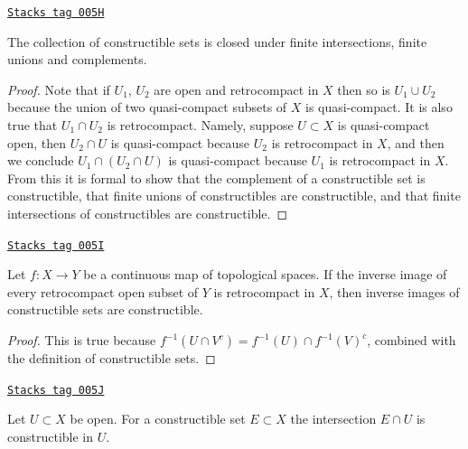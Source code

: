 \begin{lemma}[Constructible]
\label{topology-lemma-constructible}
\href{https://stacks.math.columbia.edu/tag/005H}{\texttt{Stacks tag 005H}}

The collection of constructible sets is closed under
finite intersections, finite unions and complements.
\end{lemma}

\begin{proof}
Note that if $U_1$, $U_2$ are open and retrocompact in $X$
then so is $U_1 \cup U_2$ because the union of two quasi-compact
subsets of $X$ is quasi-compact. It is also true that
$U_1 \cap U_2$ is retrocompact. Namely, suppose $U \subset X$
is quasi-compact open, then $U_2 \cap U$ is quasi-compact because
$U_2$ is retrocompact in $X$, and then we conclude
$U_1 \cap (U_2 \cap U)$ is quasi-compact because $U_1$ is
retrocompact in $X$. From this it is formal to show that
the complement of a constructible set is constructible,
that finite unions of constructibles are constructible, and
that finite intersections of constructibles are constructible.
\end{proof}

\begin{lemma}
\label{topology-lemma-inverse-images-constructibles}
\href{https://stacks.math.columbia.edu/tag/005I}{\texttt{Stacks tag 005I}}

Let $f : X \to Y$ be a continuous map of topological spaces.
If the inverse image of every retrocompact open subset of $Y$
is retrocompact in $X$, then inverse images of constructible
sets are constructible.
\end{lemma}

\begin{proof}
This is true because $f^{-1}(U \cap V^c) = f^{-1}(U) \cap f^{-1}(V)^c$,
combined with the definition of constructible sets.
\end{proof}

\begin{lemma}
\label{topology-lemma-open-immersion-constructible-inverse-image}
\href{https://stacks.math.columbia.edu/tag/005J}{\texttt{Stacks tag 005J}}

Let $U \subset X$ be open. For a constructible set
$E \subset X$ the intersection $E \cap U$ is constructible
in $U$.
\end{lemma}

